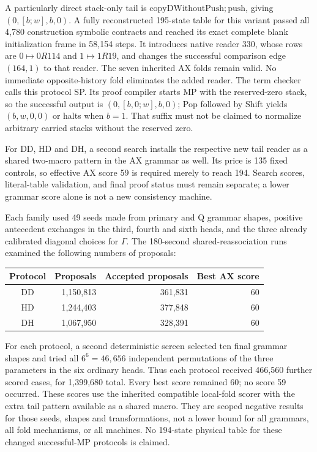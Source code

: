 A particularly direct stack-only tail is
$\mathrm{copyDWithoutPush};\mathrm{push}$, giving
$(0,[b;w],b,0)$. A fully reconstructed 195-state table for this variant
passed all 4,780 construction symbolic contracts and reached its exact
complete blank initialization frame in 58,154 steps. It introduces
native reader 330, whose rows are $0\mapsto0R114$ and
$1\mapsto1R19$, and changes the successful comparison edge $(164,1)$
to that reader. The seven inherited AX folds remain valid. No immediate
opposite-history fold eliminates the added reader.
The term checker calls this protocol SP. Its proof compiler starts MP
with the reserved-zero stack, so the successful output is
$(0,[b,0;w],b,0)$; Pop followed by Shift yields $(b,w,0,0)$ or halts
when $b=1$. That suffix must not be claimed to normalize arbitrary
carried stacks without the reserved zero.

For DD, HD and DH, a second search installs the respective new tail
reader as a shared two-macro pattern in the AX grammar as well. Its
price is 135 fixed controls, so effective AX score 59 is required merely
to reach 194. Search scores, literal-table validation, and final proof
status must remain separate; a lower grammar score alone is not a new
consistency machine.

Each family used 49 seeds made from primary and Q grammar shapes,
positive antecedent exchanges in the third, fourth and sixth heads,
and the three already calibrated diagonal choices for $\Gamma$.
The 180-second shared-reassociation runs examined the following numbers
of proposals:
\begin{center}
\begin{tabular}{crrr}
Protocol & Proposals & Accepted proposals & Best AX score\\\hline
DD & 1,150,813 & 361,831 & 60\\
HD & 1,244,403 & 377,848 & 60\\
DH & 1,067,950 & 328,391 & 60
\end{tabular}
\end{center}
For each protocol, a second deterministic screen selected ten final
grammar shapes and tried all $6^6=46,656$ independent permutations of
the three parameters in the six ordinary heads. Thus each protocol
received 466,560 further scored cases, for 1,399,680 total. Every best
score remained 60; no score 59 occurred. These scores use the inherited
compatible local-fold scorer with the extra tail pattern available as
a shared macro. They are scoped negative results for those seeds,
shapes and transformations, not a lower bound for all grammars,
all fold mechanisms, or all machines. No 194-state physical table for
these changed successful-MP protocols is claimed.

